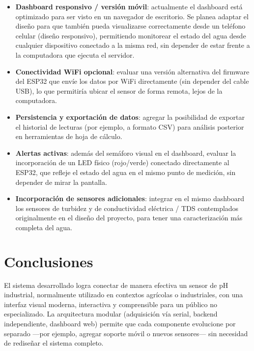 \documentclass[11pt,a4paper]{article}
\begin{document}
\begin{itemize}
    \item \textbf{Dashboard responsivo / versión móvil}: actualmente
    el dashboard está optimizado para ser visto en un navegador de
    escritorio. Se planea adaptar el diseño para que también pueda
    visualizarse correctamente desde un teléfono celular (diseño
    responsivo), permitiendo monitorear el estado del agua desde
    cualquier dispositivo conectado a la misma red, sin depender de
    estar frente a la computadora que ejecuta el servidor.
    \item \textbf{Conectividad WiFi opcional}: evaluar una versión
    alternativa del firmware del ESP32 que envíe los datos por WiFi
    directamente (sin depender del cable USB), lo que permitiría
    ubicar el sensor de forma remota, lejos de la computadora.
    \item \textbf{Persistencia y exportación de datos}: agregar la
    posibilidad de exportar el historial de lecturas (por ejemplo, a
    formato CSV) para análisis posterior en herramientas de hoja de
    cálculo.
    \item \textbf{Alertas activas}: además del semáforo visual en el
    dashboard, evaluar la incorporación de un LED físico (rojo/verde)
    conectado directamente al ESP32, que refleje el estado del agua
    en el mismo punto de medición, sin depender de mirar la pantalla.
    \item \textbf{Incorporación de sensores adicionales}: integrar
    en el mismo dashboard los sensores de turbidez y de conductividad
    eléctrica / TDS contemplados originalmente en el diseño del
    proyecto, para tener una caracterización más completa del agua.
\end{itemize}

\section{Conclusiones}

El sistema desarrollado logra conectar de manera efectiva un sensor
de pH industrial, normalmente utilizado en contextos agrícolas o
industriales, con una interfaz visual moderna, interactiva y
comprensible para un público no especializado. La arquitectura
modular (adquisición vía serial, backend independiente, dashboard
web) permite que cada componente evolucione por separado —por
ejemplo, agregar soporte móvil o nuevos sensores— sin necesidad de
rediseñar el sistema completo.
\end{document}
